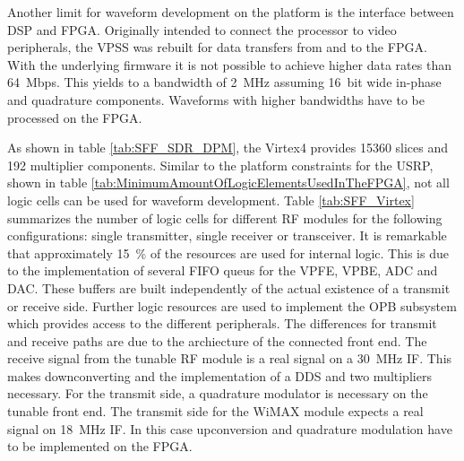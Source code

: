 Another limit for waveform development on the platform is the interface between \ac{DSP} and \ac{FPGA}. Originally intended to connect the processor to video peripherals, the \ac{VPSS} was rebuilt for data transfers from and to the \ac{FPGA}. With the underlying firmware it is not possible to achieve higher data rates than \SI{64}{Mbps}. This yields to a bandwidth of \SI{2}{MHz} assuming \SI{16}{bit} wide in-phase and quadrature components. Waveforms with higher bandwidths have to be processed on the \ac{FPGA}.

As shown in table \ref{tab:SFF_SDR_DPM}, the Virtex4 provides 15360 slices and 192 multiplier components. Similar to the platform constraints for the \ac{USRP}, shown in table \ref{tab:MinimumAmountOfLogicElementsUsedInTheFPGA}, not all logic cells can be used for waveform development. Table \ref{tab:SFF_Virtex} summarizes the number of logic cells for different RF modules for the following configurations: single transmitter, single receiver or transceiver. It is remarkable that approximately \SI{15}{\%} of the resources are used for internal logic. This is due to the implementation of several \ac{FIFO} queus for the \ac{VPFE}, \ac{VPBE}, \ac{ADC} and \ac{DAC}. These buffers are built independently of the actual existence of a transmit or receive side. Further logic resources are used to implement the \ac{OPB} subsystem which provides access to the different peripherals. The differences for transmit and receive paths are due to the archiecture of the connected front end. The receive signal from the tunable RF module is a real signal on a \SI{30}{MHz} \ac{IF}. This makes downconverting and the implementation of a \ac{DDS} and two multipliers necessary. For the transmit side, a quadrature modulator is necessary on the tunable front end. The transmit side for the WiMAX module expects a real signal on \SI{18}{MHz} \ac{IF}. In this case upconversion and quadrature modulation have to be implemented on the \ac{FPGA}.

